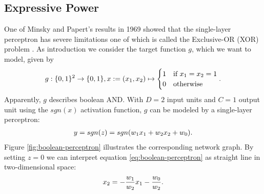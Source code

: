 \subsection{Expressive Power}
\label{subsec:expressive-power}

One of Minsky and Papert's results in 1969 showed that the single-layer perceptron has severe limitations one of which is called the Exclusive-OR (XOR) problem \cite[p.333-335]{DudaHartStork:2001}. As introduction we consider the target function $g$, which we want to model, given by
\begin{align}
g: \{0,1\}^2 \rightarrow \{0,1\}, x := (x_1, x_2) \mapsto 
\begin{cases}
1  & \text{if } x_1 = x_2 = 1\\
0 & \text{otherwise}
\end{cases}\onedot
\end{align}
Apparently, $g$ describes boolean AND. With $D = 2$ input units and $C = 1$ output unit using the $sgn(x)$ activation function, $g$ can be modeled by a single-layer perceptron:
\begin{align}
\label{eq:boolean-perceptron}
y = sgn(z) = sgn( w_{1} x_1 + w_{2} x_2 + w_{0})\onedot
\end{align}
Figure \ref{fig:boolean-perceptron} illustrates the corresponding network graph. By setting $z = 0$ we can interpret equation \eqref{eq:boolean-perceptron} as straight line in two-dimensional space:
\begin{align}
x_2 = - \frac{w_{1}}{w_{2}} x_1 - \frac{w_{0}}{w_{2}}\onedot
\end{align}
